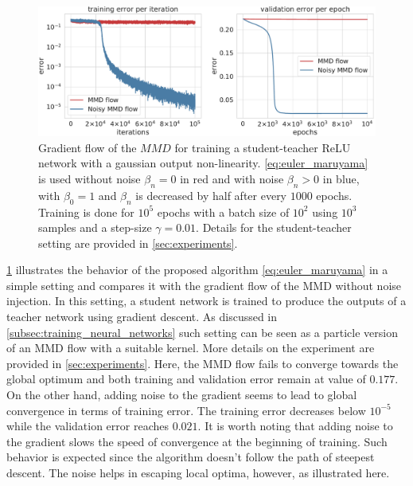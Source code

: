 \begin{figure}[ht]
	\centering
	\includegraphics[width=0.8\linewidth]{figures/student_teacher_final}
	\caption{Gradient flow of the $MMD$ for training a student-teacher ReLU network with a gaussian output non-linearity. \cref{eq:euler_maruyama} is used without noise $\beta_n=0$ in red  and with noise $\beta_n>0$ in blue, with $\beta_0=1$ and $\beta_n$ is decreased by half after every $1000$ epochs. Training is done for $10^5$ epochs with a batch size of $10^2$ using $10^3$ samples and a step-size $\gamma = 0.01$. Details for the student-teacher setting are provided in \cref{sec:experiments}.   
	}
	\label{fig:experiments_student_teacher}
\end{figure}

\cref{fig:experiments_student_teacher} illustrates the behavior of the proposed algorithm \cref{eq:euler_maruyama} in a simple setting and compares it with the gradient flow of the MMD without noise injection. In this setting, a student network is trained to produce the outputs of a teacher network using gradient descent. As discussed in \cref{subsec:training_neural_networks} such setting can be seen as a particle version of an MMD flow with a suitable kernel. More details on the experiment are provided in \cref{sec:experiments}. Here, the MMD flow  fails to converge towards the global optimum and both training and validation error remain at value of $0.177$. On the other hand, adding noise to the gradient seems to lead to global convergence in terms of training error. The training error decreases below $10^{-5}$ while the validation error reaches $0.021$. It is worth noting that adding noise to the gradient slows the speed of convergence at the beginning of training. Such behavior is expected since the algorithm doesn't follow the path of steepest descent. The noise helps in escaping local optima, however, as illustrated here.

